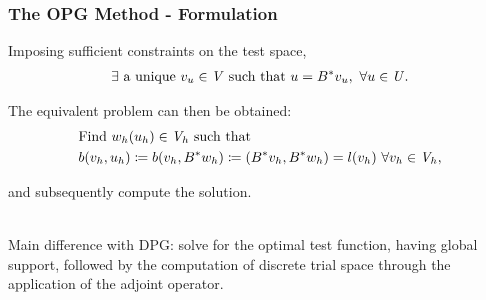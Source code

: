 \begin{frame}
\frametitle{The OPG Method - Formulation}

Imposing sufficient constraints on the test space,
\begin{align}
  \exists\ \text{a unique}\ v_u \in \mathit{{{V}}}\ \text{such that}\ u = B^*v_u,\ \forall u \in \mathit{{{U}}}.
\end{align}

The equivalent problem can then be obtained:
\begin{align}
& \text{Find}\ w_h(u_h) \in \mathit{{{V}}}_h\ \text{such that}\\
& b(v_h,u_h) \coloneqq b(v_h,B^*w_h) \coloneqq (B^*v_h,B^*w_h) = l(v_h)\ \forall v_h \in \mathit{{{V}}}_h,
\end{align}

and subsequently compute the solution.
\\~

Main difference with DPG: solve for the optimal test function, having global
support, followed by the computation of discrete trial space through the
application of the adjoint operator.

\end{frame}
